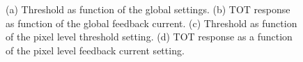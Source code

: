 \begin{figure}
\centering
\null \hfill
{}
\hfill
{}
\hfill \null
\null \hfill
{}
\hfill
{}
\hfill \null
\caption{(a) Threshold as function of the global settings. (b) TOT response as function of the global feedback current. (c) Threshold as function of the pixel level threshold setting. (d) TOT response as a function of the pixel level feedback current setting.}
\end{figure}


